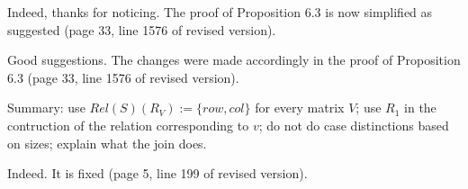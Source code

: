\answer Indeed, thanks for noticing. The proof of Proposition 6.3 is now simplified as suggested (page 33, line 1576 of revised version).
\bigskip

\begin{comment}
	Comparison with $K$-Relations: Just use $Rel(S)(R_V) := \{row, col\}$ for every matrix $V$. row and col encode the domain of the indices of the matrix, as in your construction. The only
	difference is, that this domain could be the singleton $\{1\}$. And you should omit
	the subscripts alpha and beta of row and col. They are not needed, as the domain
	is encoded by the relation. If you omit the subscripts you will not need to
	talk about types at all in most parts of the proof. The soundness of the
	MATLANG expression ensures that the domains of row and col are correct.
	
	To always provide a col attribute you need a new relation $R_1$ with attribute
	col and a single number 1 inside the relation. You can then change $Q(v_p)$ to be
	$$
	\sigma_{row, \gamma_p} (\rho_{\alpha -> \gamma_p}(R_\alpha) \texttt{join} \rho_{\alpha ->
			row}(R_\alpha) \texttt{join} R_1)
	$$
	This construction simplifies the definition for transposition to just
	rename row $\rightarrow$ col and col $\rightarrow$ row. Also for the other operators you only need
	to talk about one case. And types are working flawlessly. E.g. matrix product
	becomes rename col $\rightarrow$ C for the first expression and row $\rightarrow$ C for the second
	expression before doing the join. However you have to explain what the join
	does, i.e., that it just computes the same sum as the matrix product.
\end{comment}

\answer Good suggestions. The changes were made accordingly in the proof of Proposition 6.3 (page 33, line 1576 of revised version).

Summary: use $Rel(S)(R_V) := \{row, col\}$ for every matrix $V$; use $R_1$ in the contruction of the relation corresponding to $v$; do not do case distinctions based on sizes; explain what the join does.
\bigskip

\begin{comment}
line 183: this is ugly to read. Please align at := and at if.
\end{comment}

\answer Indeed. It is fixed (page 5, line 199 of revised version).
\bigskip

\begin{comment}
	line 216: this also should be aligned.
\end{comment}

